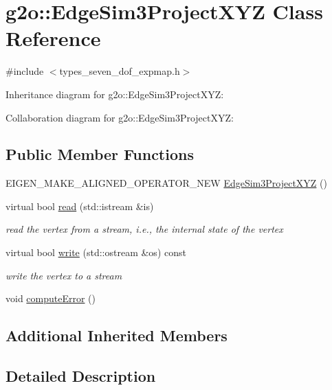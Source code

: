 \hypertarget{classg2o_1_1EdgeSim3ProjectXYZ}{}\section{g2o\+:\+:Edge\+Sim3\+Project\+X\+YZ Class Reference}
\label{classg2o_1_1EdgeSim3ProjectXYZ}


{\ttfamily \#include $<$types\+\_\+seven\+\_\+dof\+\_\+expmap.\+h$>$}



Inheritance diagram for g2o\+:\+:Edge\+Sim3\+Project\+X\+YZ\+:


Collaboration diagram for g2o\+:\+:Edge\+Sim3\+Project\+X\+YZ\+:
\subsection*{Public Member Functions}
\begin{DoxyCompactItemize}
\item 
E\+I\+G\+E\+N\+\_\+\+M\+A\+K\+E\+\_\+\+A\+L\+I\+G\+N\+E\+D\+\_\+\+O\+P\+E\+R\+A\+T\+O\+R\+\_\+\+N\+EW \hyperlink{classg2o_1_1EdgeSim3ProjectXYZ_a97beb2afff3d5b8bb6d19dccd032da14}{Edge\+Sim3\+Project\+X\+YZ} ()
\item 
virtual bool \hyperlink{classg2o_1_1EdgeSim3ProjectXYZ_aaf72b3f12f99f131e6c3395baf796fe9}{read} (std\+::istream \&is)
\begin{DoxyCompactList}\small\item\em read the vertex from a stream, i.\+e., the internal state of the vertex \end{DoxyCompactList}\item 
virtual bool \hyperlink{classg2o_1_1EdgeSim3ProjectXYZ_ad29bc1412dd5141b9ff9b5bb7363db4c}{write} (std\+::ostream \&os) const 
\begin{DoxyCompactList}\small\item\em write the vertex to a stream \end{DoxyCompactList}\item 
void \hyperlink{classg2o_1_1EdgeSim3ProjectXYZ_ae821156265db463d49b9ac2166186274}{compute\+Error} ()
\end{DoxyCompactItemize}
\subsection*{Additional Inherited Members}


\subsection{Detailed Description}


